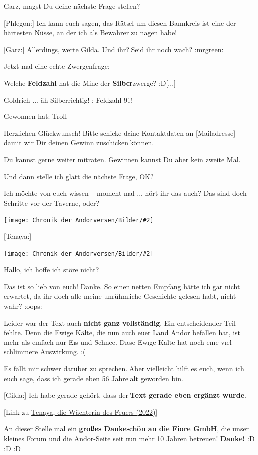 \documentclass[10pt, a4paper, oneside]{book}
\newcommand{\refstorytext}[1]{\hyperref[Storytext: #1]{#1}}
\newcommand{\bildmitts}[2][height=0.32\textwidth,width=0.48\textwidth,keepaspectratio]{%
    \begin{center}
        \texttt{[image: Chronik der Andorversen/Bilder/\#2]}
    \end{center}
}
\begin{document}
\begin{multicols}{2}
Garz, magst Du deine nächste Frage stellen?

[Phlegon:] Ich kann euch sagen, das Rätsel um diesen Bannkreis ist eine der härtesten Nüsse, an der ich als Bewahrer zu nagen habe!

[Garz:] Allerdings, werte Gilda. Und ihr? Seid ihr noch wach? :mrgreen:

Jetzt mal eine echte Zwergenfrage:

Welche \textbf{Feldzahl} hat die Mine der \textbf{Silber}zwerge? :D[...] 

Goldrich ... äh Silberrichtig! : Feldzahl 91!

Gewonnen hat: Troll

Herzlichen Glückwunsch! Bitte schicke deine Kontaktdaten an [Mailadresse] damit wir Dir deinen Gewinn zuschicken können.

Du kannst gerne weiter mitraten. Gewinnen kannst Du aber kein zweite Mal.

Und dann stelle ich glatt die nächste Frage, OK?


Ich möchte von euch wissen – moment mal ... hört ihr das auch? Das sind doch Schritte vor der Taverne, oder?

\bildmitts{AA2022 Tavernen-Party 5.jpeg}



[Tenaya:] 

\bildmitts{AA2022 Tavernen-Party 6.jpeg}

Hallo, ich hoffe ich störe nicht?

Das ist so lieb von euch! Danke. So einen netten Empfang hätte ich gar nicht erwartet, da ihr doch alle meine unrühmliche Geschichte gelesen habt, nicht wahr? :oops:

Leider war der Text auch \textbf{nicht ganz vollständig}. Ein entscheidender Teil fehlte. Denn die Ewige Kälte, die nun auch euer Land Andor befallen hat, ist mehr als einfach nur Eis und Schnee. Diese Ewige Kälte hat noch eine viel schlimmere Auswirkung. :(

Es fällt mir schwer darüber zu sprechen. Aber vielleicht hilft es euch, wenn ich euch sage, dass ich gerade eben 56 Jahre alt geworden bin.

[Gilda:] Ich habe gerade gehört, dass der \textbf{Text gerade eben ergänzt wurde}.

[Link zu \refstorytext{Tenaya, die Wächterin des Feuers (2022)}]

An dieser Stelle mal ein \textbf{großes Dankeschön an die Fiore GmbH}, die unser kleines Forum und die Andor-Seite seit nun mehr 10 Jahren betreuen! \textbf{Danke!} :D :D :D


\end{multicols}
\end{document}
